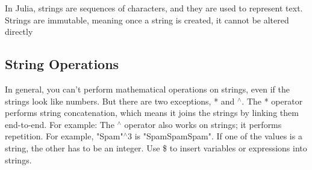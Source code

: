 \documentclass{report}
\begin{document}

    \pagebreak 
    \bigbreak \noindent
    In Julia, strings are sequences of characters, and they are used to represent text. Strings are immutable, meaning once a string is created, it cannot be altered directly
    \bigbreak \noindent 
    \subsection{String Operations}
    \bigbreak \noindent 
    In general, you can’t perform mathematical operations on strings, even if the strings look like numbers. But there are two exceptions, * and $^{\land}$.
    \bigbreak \noindent 
    The * operator performs string concatenation, which means it joins the strings by linking them end-to-end. For example:
    \bigbreak \noindent 
    The $^{\land} $ operator also works on strings; it performs repetition. For example, "Spam"$^{\land}3$ is "SpamSpamSpam". If one of the values is a string, the other has to be an integer.
    \bigbreak \noindent 
    Use \$ to insert variables or expressions into strings.
    \bigbreak \noindent 
    \bigbreak \noindent 
\end{document}
